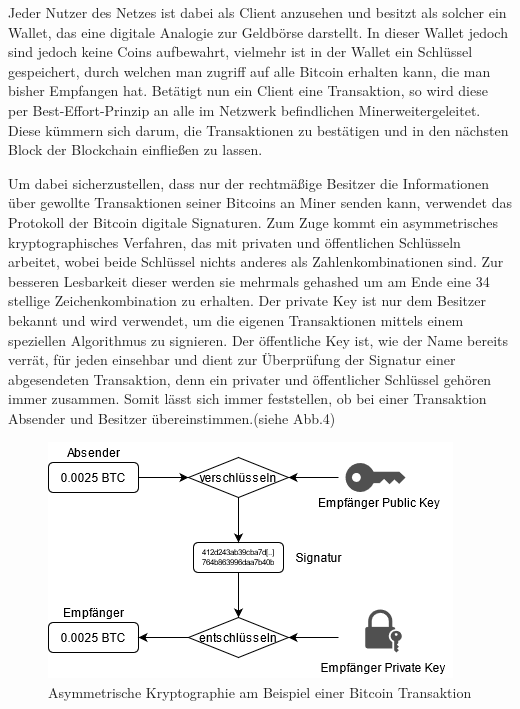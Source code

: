 \documentclass[12pt,oneside]{article}
\begin{document}
Jeder Nutzer des Netzes ist dabei als Client anzusehen und besitzt als solcher ein Wallet, das eine digitale Analogie zur Geldbörse darstellt. In dieser Wallet jedoch sind jedoch keine Coins aufbewahrt, vielmehr ist in der Wallet ein Schlüssel gespeichert, durch welchen man zugriff auf alle Bitcoin erhalten kann, die man bisher Empfangen hat. Betätigt nun ein Client eine Transaktion, so wird diese per \glqq Best-Effort\grqq -Prinzip an alle im Netzwerk befindlichen \glqq Miner\grqq  weitergeleitet. Diese kümmern sich darum, die Transaktionen zu bestätigen und in den nächsten Block der Blockchain einfließen zu lassen.

Um dabei sicherzustellen, dass nur der rechtmäßige Besitzer die Informationen über gewollte Transaktionen seiner Bitcoins an Miner senden kann, verwendet das Protokoll der Bitcoin digitale Signaturen. Zum Zuge kommt ein asymmetrisches kryptographisches Verfahren, das mit privaten und öffentlichen Schlüsseln arbeitet, wobei beide Schlüssel nichts anderes als Zahlenkombinationen sind. Zur besseren Lesbarkeit dieser werden sie mehrmals gehashed um am Ende eine 34 stellige Zeichenkombination zu erhalten. Der private Key ist nur dem Besitzer bekannt und wird verwendet, um die eigenen Transaktionen mittels einem speziellen Algorithmus zu signieren. Der öffentliche Key ist, wie der Name bereits verrät, für jeden einsehbar und dient zur Überprüfung der Signatur einer abgesendeten Transaktion, denn ein privater und öffentlicher Schlüssel gehören immer zusammen. Somit lässt sich immer feststellen, ob bei einer Transaktion Absender und Besitzer übereinstimmen.(siehe Abb.4)
\cite{soeteman2019}\cite{binance}


\begin{figure}[h]
\centering
\includegraphics[scale=0.9]{./images/pubprivkey.png}
\caption{Asymmetrische Kryptographie am Beispiel einer Bitcoin Transaktion \cite{coincierge}}
\centering
\end{figure}
\end{document}
